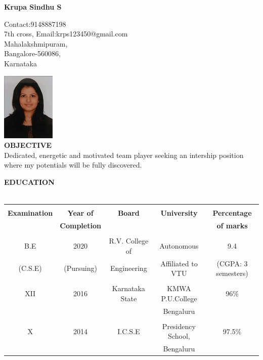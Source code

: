 \documentclass[letterpaper,11pt,oneside]{article}
\begin{document}
\begin{center}
\textbf{{\large Krupa Sindhu S}}\\
\end{center}
\vspace{-2ex}
\noindent\hrulefill
\vspace{1ex}

\small { \hfill  {Contact:9148887198}\\
	{7th cross,} \hfill  {Email:krps123450@gmail.com}\\
	{Mahalakshmipuram},\\
	{Bangalore-560086,}\\
	{Karnataka}}

 \hfill \includegraphics[scale=0.7]{krupa.jpg}\\
 
 \noindent\textbf{{\normalsize  OBJECTIVE}}\\
 \small {Dedicated, energetic and motivated team player seeking an intership position where my potentials will be fully discovered.\\}
 
 \noindent\textbf{{\normalsize  EDUCATION}}\\
 \\
 \begin{tabular}{ |c|c|c|c|c| } 
 	\hline
 	&&&&\\ 
 	\textbf{\large{Examination}} & \textbf{\large{Year of}} & \textbf{\large{Board}} & \textbf{\large{University}} & \textbf{\large{Percentage}} \\
 	& \textbf{Completion} & &  &\textbf{of marks}  \\
 	\hline
 	&&&&\\ 
 	B.E&2020 &R.V. College of & Autonomous  & 9.4\\   
 	(C.S.E)  &  (Pursuing) & Engineering &Affiliated to VTU   &(CGPA: 3 semesters) \\
 	\hline
 	&&&&\\ 
 	XII &2016  & Karnataka State & KMWA P.U.College &  96\% \\
 	&  & & Bengaluru & \\
 	\hline
 	&&&&\\ 
 	X & 2014   & I.C.S.E & Presidency School, & 97.5\% \\
 	&  & & Bengaluru & \\
 	\hline
 \end{tabular}
\end{document}
